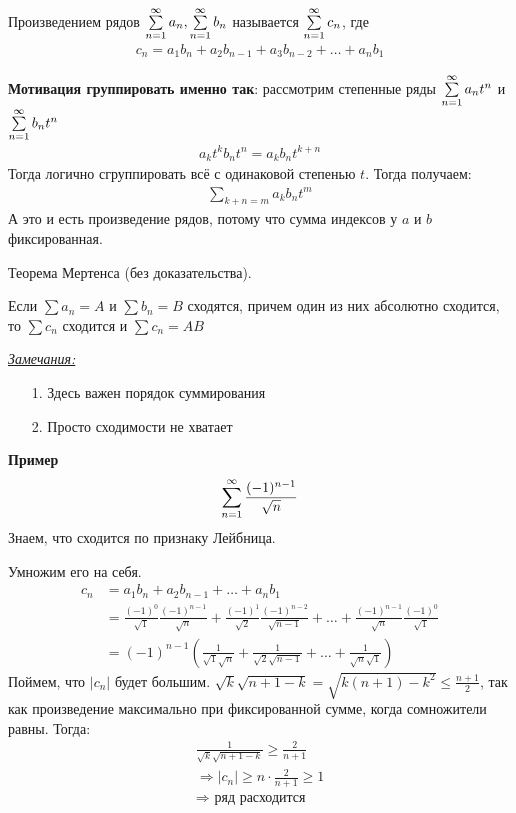 \begin{conj}
    Произведением рядов $\sum \limits_{n=1}^\infty a_n, \sum \limits_{n=1}^\infty b_n$ называется $\sum \limits_{n=1}^\infty c_n$, где 
    \begin{gather*} 
        c_n = a_1b_n + a_2b_{n-1}+a_3b_{n-2} + \ldots + a_nb_1
    \end{gather*}
\end{conj}

\textbf{Мотивация группировать именно так}: рассмотрим степенные ряды $\sum \limits_{n=1}^\infty a_nt^n$ и $\sum \limits_{n=1}^\infty b_nt^n$
\begin{gather*}
    a_kt^k b_nt^n = a_kb_n t^{k+n}
\end{gather*}
Тогда логично сгруппировать всё с одинаковой степенью $t$. Тогда получаем:
\begin{gather*}
   \sum\limits_{k+n = m}a_kb_n t^m
\end{gather*}
А это и есть произведение рядов, потому что сумма индексов у $a$ и $b$ фиксированная. 

\begin{theorem}
    Теорема Мертенса (без доказательства). 
    
    Если $\sum a_n = A$ и $\sum b_n = B$ сходятся, 
    причем один из них абсолютно сходится, то $\sum c_n$ сходится и $\sum c_n = AB$
\end{theorem}

\underline{\textit{Замечания:}}
\begin{enumerate}
    \item[1.] Здесь важен порядок суммирования
    \item[2.] Просто сходимости не хватает 
\end{enumerate}

\textbf{Пример}
\begin{equation*}
    \sum \limits_{n=1}^\infty \frac{(-1)^{n-1}}{\sqrt{n}}
\end{equation*}
Знаем, что сходится по признаку Лейбница.

Умножим его на себя. 
\begin{align*}
    c_n &= a_1b_n + a_2b_{n-1} + \ldots + a_nb_1 \\
    &= \frac{(-1)^0}{\sqrt{1}} \frac{(-1)^{n-1}}{\sqrt{n}} + 
    \frac{(-1)^1}{\sqrt{2}}\frac{(-1)^{n-2}}{\sqrt{n-1}} + \ldots +
    \frac{(-1)^{n-1}}{\sqrt{n}}\frac{(-1)^0}{\sqrt{1}} \\
    &= (-1)^{n-1} (\frac{1}{\sqrt{1}\sqrt{n}} + 
    \frac{1}{\sqrt{2}\sqrt{n-1}} + \ldots + \frac{1}{\sqrt{n}\sqrt{1}})
\end{align*}
Поймем, что $|c_n|$ будет большим. $\sqrt{k}\sqrt{n+1-k} = \sqrt{k(n+1)-k^2} \leq \frac{n+1}{2}$, 
так как произведение максимально при фиксированной сумме, когда сомножители равны.
Тогда:
\begin{gather*}
    \frac{1}{\sqrt{k}\sqrt{n+1-k}} \geq \frac{2}{n+1} \\
    \Longrightarrow |c_n| \geq n \cdot \frac{2}{n+1} \geq 1 \\
    \Longrightarrow \text{ ряд расходится}
\end{gather*}

